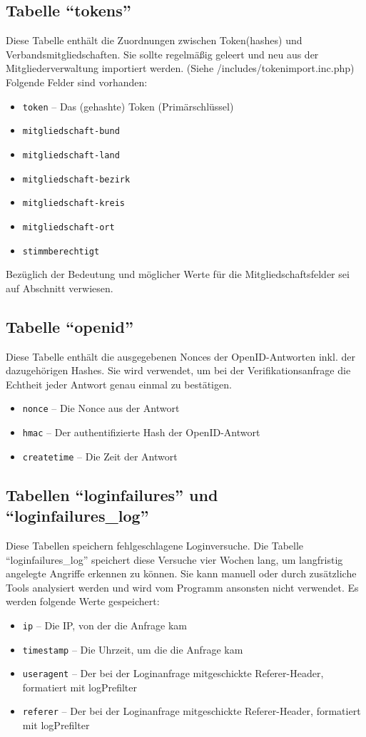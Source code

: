 \subsection{Tabelle "`tokens"'}
Diese Tabelle enthält die Zuordnungen zwischen Token(hashes) und Verbandsmitgliedschaften.
Sie sollte regelmäßig geleert und neu aus der Mitgliederverwaltung importiert werden. (Siehe /includes/tokenimport.inc.php)
Folgende Felder sind vorhanden:
\begin{itemize}
	\item \texttt{token} -- Das (gehashte) Token (Primärschlüssel)
	\item \texttt{mitgliedschaft-bund}
	\item \texttt{mitgliedschaft-land}
	\item \texttt{mitgliedschaft-bezirk}
	\item \texttt{mitgliedschaft-kreis}
	\item \texttt{mitgliedschaft-ort}
	\item \texttt{stimmberechtigt}
\end{itemize}

Bezüglich der Bedeutung und möglicher Werte für die Mitgliedschaftsfelder sei auf Abschnitt  verwiesen.

\subsection{Tabelle "`openid"'}
Diese Tabelle enthält die ausgegebenen Nonces der OpenID-Antworten inkl. der dazugehörigen Hashes.
Sie wird verwendet, um bei der Verifikationsanfrage die Echtheit jeder Antwort genau einmal zu bestätigen.
\begin{itemize}
	\item \texttt{nonce} -- Die Nonce aus der Antwort
	\item \texttt{hmac} -- Der authentifizierte Hash der OpenID-Antwort
	\item \texttt{createtime} -- Die Zeit der Antwort
\end{itemize}

\subsection{Tabellen "`loginfailures"' und "`loginfailures\_log"'}
Diese Tabellen speichern fehlgeschlagene Loginversuche.
Die Tabelle "`loginfailures\_log"' speichert diese Versuche vier Wochen lang, um langfristig angelegte Angriffe erkennen zu können.
Sie kann manuell oder durch zusätzliche Tools analysiert werden und wird vom Programm ansonsten nicht verwendet.
Es werden folgende Werte gespeichert:
\begin{itemize}
	\item \texttt{ip} -- Die IP, von der die Anfrage kam
	\item \texttt{timestamp} -- Die Uhrzeit, um die die Anfrage kam
	\item \texttt{useragent} -- Der bei der Loginanfrage mitgeschickte Referer-Header, formatiert mit logPrefilter
	\item \texttt{referer} -- Der bei der Loginanfrage mitgeschickte Referer-Header, formatiert mit logPrefilter
\end{itemize}

